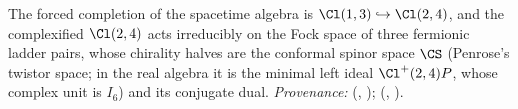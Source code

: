 The forced completion of the spacetime algebra is $\Cl(1,3) \hookrightarrow \Cl(2,4)$, and the complexified $\Cl(2,4)$ acts irreducibly on the Fock space of three fermionic ladder pairs, whose chirality halves are the conformal spinor space $\CS$ (Penrose's twistor space; in the real algebra it is the minimal left ideal $\Cl^+(2,4)P$, whose complex unit is $I_6$) and its conjugate dual. \emph{Provenance:} \cite[Thms.~4.2 and 4.13]{ButlerT1} (, ); \cite[Thms.~3.1 and 3.4]{ButlerT9} (, ).
